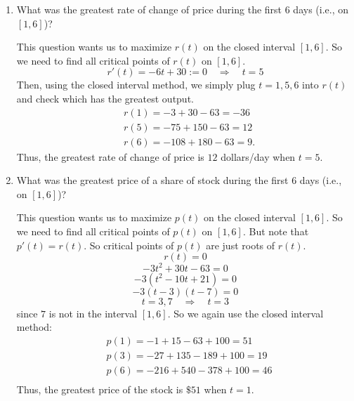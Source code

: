 \documentclass[nooutcomes]{ximera}
\begin{document}
\begin{problem}
\begin{enumerate}
	\item  What was the greatest rate of change of price during the first $6$ days (i.e., on $[1,6]$)?
		\begin{freeResponse}
		This question wants us to maximize $r(t)$ on the closed interval $[1,6]$.
		So we need to find all critical points of $r(t)$ on $[1,6]$.
		$$ r'(t) = -6t+30:=0 \quad \Longrightarrow \quad t=5  $$
		Then, using the closed interval method, we simply plug $t=1,5,6$ into $r(t)$ and check which has the greatest output.
			\begin{align*}
			&r(1) = -3+30-63=-36  \\
			&r(5) = -75+150-63=12  \\
			&r(6) = -108+180-63=9.
			\end{align*}
		Thus, the greatest rate of change of price is $12$ dollars/day when $t=5$.
		\end{freeResponse}




	\item  What was the greatest price of a share of stock during the first $6$ days (i.e., on $[1,6]$)?
		\begin{freeResponse}
		This question wants us to maximize $p(t)$ on the closed interval $[1,6]$.
		So we need to find all critical points of $p(t)$ on $[1,6]$.
		But note that $p'(t) = r(t)$.  So critical points of $p(t)$ are just roots of $r(t)$.
		$$ r(t) = 0 $$
		$$ -3t^2+30t-63 = 0 $$
		$$ -3(t^2-10t+21)=0 $$
		$$ -3(t-3)(t-7) = 0 $$
		$$ t=3,7 \quad \Longrightarrow \quad t=3 $$
		since $7$ is not in the interval $[1,6]$.
		So we again use the closed interval method:
			\begin{align*}
			&p(1) = -1+15-63+100 = 51  \\
			&p(3) = -27 + 135 - 189 + 100 = 19  \\
			&p(6) = -216+540-378+100=46  \\
			\end{align*}
		Thus, the greatest price of the stock is $\$51$ when $t=1$.
		\end{freeResponse}
	\end{enumerate}
\end{problem}
\end{document}
